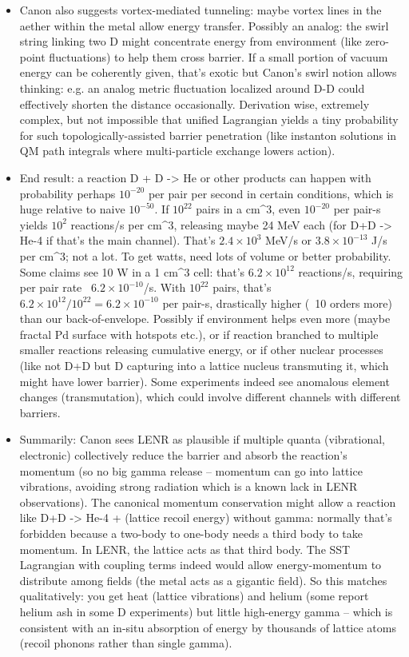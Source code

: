 \documentclass[11pt]{article}
\begin{document}
\begin{itemize}
\item 
Canon also suggests vortex-mediated tunneling: maybe vortex lines in the aether within the metal allow energy transfer. Possibly an analog: the swirl string linking two D might concentrate energy from environment (like zero-point fluctuations) to help them cross barrier. If a small portion of vacuum energy can be coherently given, that’s exotic but Canon’s swirl notion allows thinking: e.g. an analog metric fluctuation localized around D-D could effectively shorten the distance occasionally. Derivation wise, extremely complex, but not impossible that unified Lagrangian yields a tiny probability for such topologically-assisted barrier penetration (like instanton solutions in QM path integrals where multi-particle exchange lowers action).




\item 
End result: a reaction D + D -> He or other products can happen with probability perhaps $10^{-20}$ per pair per second in certain conditions, which is huge relative to naive $10^{-50}$. If $10^{22}$ pairs in a cm^3, even $10^{-20}$ per pair-s yields $10^2$ reactions/s per cm^3, releasing maybe 24 MeV each (for D+D -> He-4 if that’s the main channel). That’s $2.4\times10^3$ MeV/s or $3.8\times10^{-13}$ J/s per cm^3; not a lot. To get watts, need lots of volume or better probability. Some claims see 10 W in a 1 cm^3 cell: that’s $6.2\times10^{12}$ reactions/s, requiring per pair rate ~$6.2\times10^{-10}$/s. With $10^{22}$ pairs, that’s $6.2\times10^{12}/10^{22} = 6.2\times10^{-10}$ per pair-s, drastically higher (~10 orders more) than our back-of-envelope. Possibly if environment helps even more (maybe fractal Pd surface with hotspots etc.), or if reaction branched to multiple smaller reactions releasing cumulative energy, or if other nuclear processes (like not D+D but D capturing into a lattice nucleus transmuting it, which might have lower barrier). Some experiments indeed see anomalous element changes (transmutation), which could involve different channels with different barriers.




\item 
Summarily: Canon sees LENR as plausible if multiple quanta (vibrational, electronic) collectively reduce the barrier and absorb the reaction’s momentum (so no big gamma release – momentum can go into lattice vibrations, avoiding strong radiation which is a known lack in LENR observations). The canonical momentum conservation might allow a reaction like D+D -> He-4 + (lattice recoil energy) without gamma: normally that’s forbidden because a two-body to one-body needs a third body to take momentum. In LENR, the lattice acts as that third body. The SST Lagrangian with coupling terms indeed would allow energy-momentum to distribute among fields (the metal acts as a gigantic field). So this matches qualitatively: you get heat (lattice vibrations) and helium (some report helium ash in some D experiments) but little high-energy gamma – which is consistent with an in-situ absorption of energy by thousands of lattice atoms (recoil phonons rather than single gamma).





\end{itemize}
\end{document}
